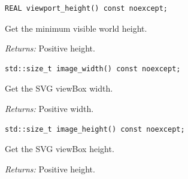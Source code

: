 \par\noindent\begin{minipage}{\linewidth}
\begin{lstlisting}[style=apireference]
REAL viewport_height() const noexcept;
\end{lstlisting}
{\footnotesize Get the minimum visible world height.\par}
{\footnotesize\textit{Returns:} Positive height.\par}
\end{minipage}\par\vspace{1pt}
\par\noindent\begin{minipage}{\linewidth}
\begin{lstlisting}[style=apireference]
std::size_t image_width() const noexcept;
\end{lstlisting}
{\footnotesize Get the SVG viewBox width.\par}
{\footnotesize\textit{Returns:} Positive width.\par}
\end{minipage}\par\vspace{1pt}
\par\noindent\begin{minipage}{\linewidth}
\begin{lstlisting}[style=apireference]
std::size_t image_height() const noexcept;
\end{lstlisting}
{\footnotesize Get the SVG viewBox height.\par}
{\footnotesize\textit{Returns:} Positive height.\par}
\end{minipage}\par\vspace{1pt}
